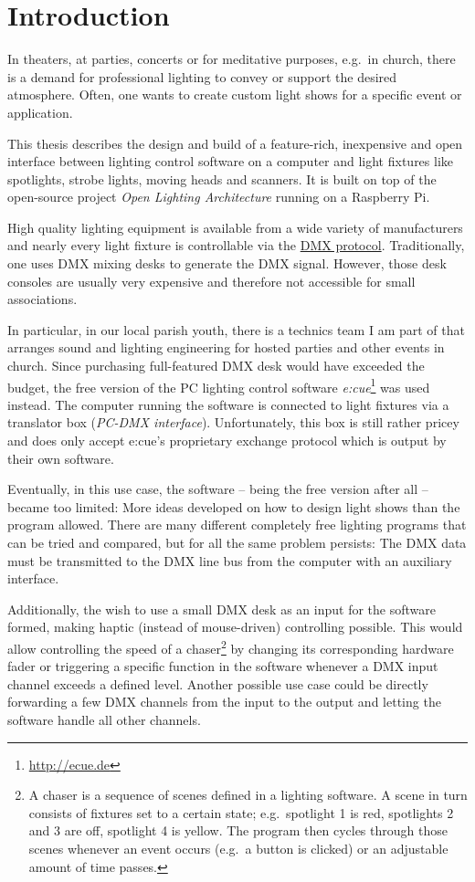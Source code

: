 \chapter{Introduction}\label{introduction}

In theaters, at parties, concerts or for meditative purposes, e.g.~in
church, there is a demand for professional lighting to convey or support
the desired atmosphere. Often, one wants to create custom light shows
for a specific event or application.

This thesis describes the design and build of a feature-rich,
inexpensive and open interface between lighting control software on a
computer and light fixtures like spotlights, strobe lights, moving heads
and scanners. It is built on top of the open-source project \emph{Open
Lighting Architecture} running on a Raspberry Pi.

High quality lighting equipment is available from a wide variety of
manufacturers and nearly every light fixture is controllable via the
\protect\hyperlink{sec:dmx-protocol}{DMX protocol}. Traditionally, one
uses DMX mixing desks to generate the DMX signal. However, those desk
consoles are usually very expensive and therefore not accessible for
small associations.

In particular, in our local parish youth, there is a technics team I am
part of that arranges sound and lighting engineering for hosted parties
and other events in church. Since purchasing full-featured DMX desk
would have exceeded the budget, the free version of the PC lighting
control software \emph{e:cue}\footnote{\url{http://ecue.de}} was used
instead. The computer running the software is connected to light
fixtures via a translator box (\emph{PC-DMX interface}). Unfortunately,
this box is still rather pricey and does only accept e:cue's proprietary
exchange protocol which is output by their own software.

Eventually, in this use case, the software -- being the free version
after all -- became too limited: More ideas developed on how to design
light shows than the program allowed. There are many different
completely free lighting programs that can be tried and compared, but
for all the same problem persists: The DMX data must be transmitted to
the DMX line bus from the computer with an auxiliary interface.

Additionally, the wish to use a small DMX desk as an input for the
software formed, making haptic (instead of mouse-driven) controlling
possible. This would allow controlling the speed of a chaser\footnote{A
  chaser is a sequence of scenes defined in a lighting software. A scene
  in turn consists of fixtures set to a certain state; e.g.~spotlight 1
  is red, spotlights 2 and 3 are off, spotlight 4 is yellow. The program
  then cycles through those scenes whenever an event occurs (e.g.~a
  button is clicked) or an adjustable amount of time passes.} by
changing its corresponding hardware fader or triggering a specific
function in the software whenever a DMX input channel exceeds a defined
level. Another possible use case could be directly forwarding a few DMX
channels from the input to the output and letting the software handle
all other channels.

